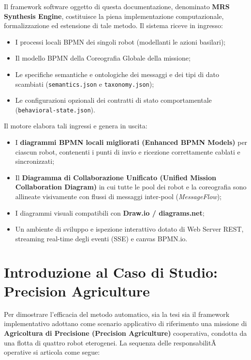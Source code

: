 ﻿\documentclass[11pt, a4paper]{report}
\begin{document}
Il framework software oggetto di questa documentazione, denominato \textbf{MRS Synthesis Engine}, costituisce la piena implementazione computazionale, formalizzazione ed estensione di tale metodo. Il sistema riceve in ingresso:
\begin{itemize}
    \item I processi locali BPMN dei singoli robot (modellanti le azioni basilari);
    \item Il modello BPMN della Coreografia Globale della missione;
    \item Le specifiche semantiche e ontologiche dei messaggi e dei tipi di dato scambiati (\texttt{semantics.json} e \texttt{taxonomy.json});
    \item Le configurazioni opzionali dei contratti di stato comportamentale (\texttt{behavioral-state.json}).
\end{itemize}

Il motore elabora tali ingressi e genera in uscita:
\begin{itemize}
    \item I \textbf{diagrammi BPMN locali migliorati (Enhanced BPMN Models)} per ciascun robot, contenenti i punti di invio e ricezione correttamente cablati e sincronizzati;
    \item Il \textbf{Diagramma di Collaborazione Unificato (Unified Mission Collaboration Diagram)} in cui tutte le pool dei robot e la coreografia sono allineate visivamente con flussi di messaggi inter-pool (\textit{MessageFlow});
    \item I diagrammi visuali compatibili con \textbf{Draw.io / diagrams.net};
    \item Un ambiente di sviluppo e ispezione interattivo dotato di Web Server REST, streaming real-time degli eventi (SSE) e canvas BPMN.io.
\end{itemize}

\section{Introduzione al Caso di Studio: Precision Agriculture}

Per dimostrare l'efficacia del metodo automatico, sia la tesi sia il framework implementativo adottano come scenario applicativo di riferimento una missione di \textbf{Agricoltura di Precisione (Precision Agriculture)} cooperativa, condotta da una flotta di quattro robot eterogenei. La sequenza delle responsabilitÃ  operative si articola come segue:
\end{document}
